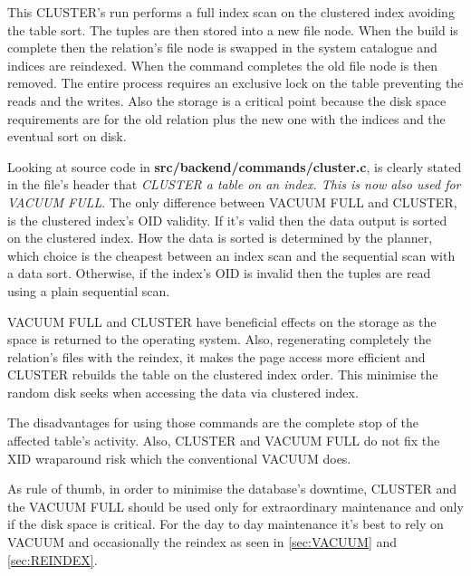 This CLUSTER's run performs a full index scan on the clustered index avoiding the table sort. The 
tuples are then stored into a new file node. When the build is complete then the relation's file 
node is swapped in the system catalogue and indices are reindexed. When the command completes the 
old file node is then removed. The entire process requires an exclusive lock on the table preventing 
the reads and the writes. Also the storage is a critical point because the disk space 
requirements are for the old relation plus the new one with the indices and the eventual sort on 
disk.\newline

Looking at source code in \textbf{src/backend/commands/cluster.c}, is clearly stated in the 
file's header that \textit{CLUSTER a table on an index.  This is now also used for VACUUM FULL}. 
The only difference between VACUUM FULL and CLUSTER, is the clustered index's OID validity. If 
it's valid then the data output is sorted on the clustered index. How the data is sorted is 
determined by the planner, which choice is the cheapest between an index scan and the sequential 
scan with a data sort. Otherwise, if the index's OID is invalid then the tuples are read using a 
plain sequential scan.\newline

VACUUM FULL and CLUSTER have beneficial effects on the storage as the space is returned to the 
operating system. Also, regenerating completely the relation's files with the reindex, it makes the 
page access more efficient and CLUSTER rebuilds the table on the clustered index order. This 
minimise the random disk seeks when accessing the data via clustered index.\newline

The disadvantages for using those commands are the complete stop of the affected table's activity. 
Also, CLUSTER and VACUUM FULL do not fix the XID wraparound risk which the conventional VACUUM 
does.\newline

As rule of thumb, in order to minimise the database's downtime, CLUSTER and the VACUUM FULL should 
be used only for extraordinary maintenance and only if the disk space is critical. For the day to 
day maintenance it's best to rely on VACUUM and occasionally the reindex as seen in \ref{sec:VACUUM} 
and \ref{sec:REINDEX}.
 



